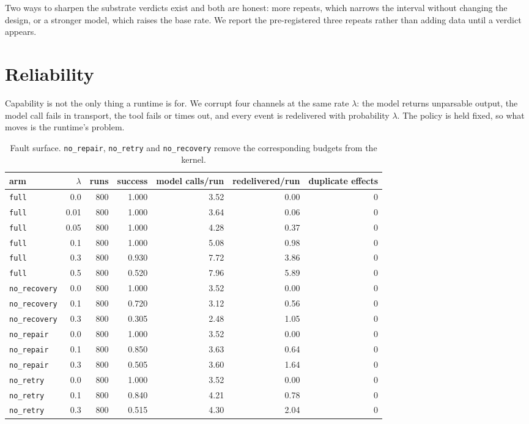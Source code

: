 \documentclass[11pt,a4paper]{article}
\begin{document}
Two ways to sharpen the substrate verdicts exist and both are honest: more
repeats, which narrows the interval without changing the design, or a stronger
model, which raises the base rate. We report the pre-registered three repeats
rather than adding data until a verdict appears.

\section{Reliability}
\label{sec:faults}

Capability is not the only thing a runtime is for. We corrupt four channels at
the same rate $\lambda$: the model returns unparsable output, the model call
fails in transport, the tool fails or times out, and every event is redelivered
with probability $\lambda$. The policy is held fixed, so what moves is the
runtime's problem.

\begin{table}[h]\centering\small
\caption{Fault surface. \texttt{no\_repair}, \texttt{no\_retry} and
\texttt{no\_recovery} remove the corresponding budgets from the kernel.}
\label{tab:faults}
\begin{tabular}{lrrrrrr}
\toprule
arm & $\lambda$ & runs & success & model calls/run & redelivered/run & duplicate effects \\
\midrule
\texttt{full} & 0.0 & 800 & 1.000 & 3.52 & 0.00 & 0 \\
\texttt{full} & 0.01 & 800 & 1.000 & 3.64 & 0.06 & 0 \\
\texttt{full} & 0.05 & 800 & 1.000 & 4.28 & 0.37 & 0 \\
\texttt{full} & 0.1 & 800 & 1.000 & 5.08 & 0.98 & 0 \\
\texttt{full} & 0.3 & 800 & 0.930 & 7.72 & 3.86 & 0 \\
\texttt{full} & 0.5 & 800 & 0.520 & 7.96 & 5.89 & 0 \\
\texttt{no\_recovery} & 0.0 & 800 & 1.000 & 3.52 & 0.00 & 0 \\
\texttt{no\_recovery} & 0.1 & 800 & 0.720 & 3.12 & 0.56 & 0 \\
\texttt{no\_recovery} & 0.3 & 800 & 0.305 & 2.48 & 1.05 & 0 \\
\texttt{no\_repair} & 0.0 & 800 & 1.000 & 3.52 & 0.00 & 0 \\
\texttt{no\_repair} & 0.1 & 800 & 0.850 & 3.63 & 0.64 & 0 \\
\texttt{no\_repair} & 0.3 & 800 & 0.505 & 3.60 & 1.64 & 0 \\
\texttt{no\_retry} & 0.0 & 800 & 1.000 & 3.52 & 0.00 & 0 \\
\texttt{no\_retry} & 0.1 & 800 & 0.840 & 4.21 & 0.78 & 0 \\
\texttt{no\_retry} & 0.3 & 800 & 0.515 & 4.30 & 2.04 & 0 \\
\bottomrule
\end{tabular}
\end{table}
\end{document}
